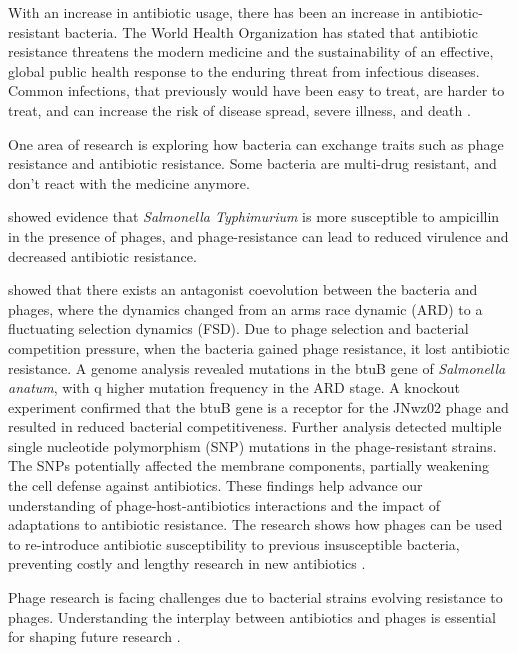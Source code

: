 With an increase in antibiotic usage, there has been an increase in antibiotic-resistant bacteria.
The World Health Organization has stated that antibiotic resistance threatens the modern medicine and the sustainability of an effective, global public health response to the enduring threat from infectious diseases.
Common infections, that previously would have been easy to treat, are harder to treat, and can increase the risk of disease spread, severe illness, and death \cite{GlobalActionPlan}. 

One area of research is exploring how bacteria can exchange traits such as phage resistance and antibiotic resistance.
Some bacteria are multi-drug resistant, and don't react with the medicine anymore.

\citet{laurePhageResistancemediatedTradeoffs2022} showed evidence that \textit{Salmonella Typhimurium} is more susceptible to ampicillin in the presence of phages, and phage-resistance can lead to reduced virulence and decreased antibiotic resistance. 

\citet{zhaoPhagedrivenCoevolutionReveals2024} showed that there exists an antagonist coevolution between the bacteria and phages, where the dynamics changed from an arms race dynamic (ARD) to a fluctuating selection dynamics (FSD).
Due to phage selection and bacterial competition pressure, when the bacteria gained phage resistance, it lost antibiotic resistance.
A genome analysis revealed mutations in the btuB gene of \textit{Salmonella anatum}, with q higher mutation frequency in the ARD stage.
A knockout experiment confirmed that the btuB gene is a receptor for the JNwz02 phage and resulted in reduced bacterial competitiveness.
Further analysis detected multiple single nucleotide polymorphism (SNP) mutations in the phage-resistant strains.
The SNPs potentially affected the membrane components, partially weakening the cell defense against antibiotics.
These findings help advance our understanding of phage-host-antibiotics interactions and the impact of adaptations to antibiotic resistance.
The research shows how phages can be used to re-introduce antibiotic susceptibility to previous insusceptible bacteria, preventing costly and lengthy research in new antibiotics \cite{zhaoPhagedrivenCoevolutionReveals2024}. 

Phage research is facing challenges due to bacterial strains evolving resistance to phages.
Understanding the interplay between antibiotics and phages is essential for shaping future research \cite{zhaoPhagedrivenCoevolutionReveals2024}.


